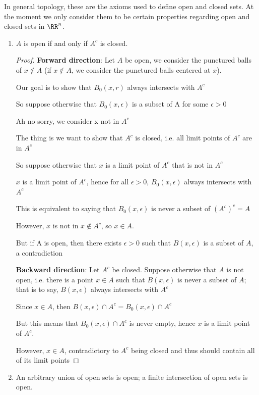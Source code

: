 In general topology, these are the axioms used to define open and closed sets. At the moment we only consider them to be certain properties regarding open and closed sets in $\RR^n$.
\begin{enumerate}[label=\textbf{P\arabic*}]
\item $A$ is open if and only if $A^c$ is closed.

\begin{proof}
\textbf{Forward direction}:
Let $A$ be open, we consider the punctured balls of $x \notin A$ (if $x \notin A$, we consider the punctured balls centered at $x$).

Our goal is to show that $B_0(x,r)$ always intersects with $A^c$

So suppose otherwise that $B_0(x,\epsilon)$ is a subset of A for some $\epsilon>0$

Ah no sorry, we consider x not in $A^c$

The thing is we want to show that $A^c$ is closed, i.e. all limit points of $A^c$ are in $A^c$

So suppose otherwise that $x$ is a limit point of $A^c$ that is not in $A^c$

$x$ is a limit point of $A^c$, hence for all $\epsilon>0$, $B_0(x,\epsilon)$ always intersects with $A^c$

This is equivalent to saying that $B_0(x,\epsilon)$ is never a subset of $(A^c)^c=A$

However, $x$ is not in $x \notin A^c$, so $x \in A$.

But if A is open, then there exists $\epsilon>0$ such that $B(x,\epsilon)$ is a subset of $A$, a contradiction

\textbf{Backward direction}: Let $A^c$ be closed. Suppose otherwise that $A$ is not open, i.e. there is a point $x\in A$ such that $B(x,\epsilon)$ is never a subset of $A$; that is to say, $B(x,\epsilon)$ always intersects with $A^c$

Since $x \in A$, then $B(x,\epsilon) \cap A^c = B_0(x,\epsilon) \cap A^c$

But this means that $B_0(x,\epsilon) \cap A^c$ is never empty, hence $x$ is a limit point of $A^c$.

However, $x \in A$, contradictory to $A^c$ being closed and thus should contain all of its limit points
\end{proof}

\item An arbitrary union of open sets is open; a finite intersection of open sets is open.


\end{enumerate}
